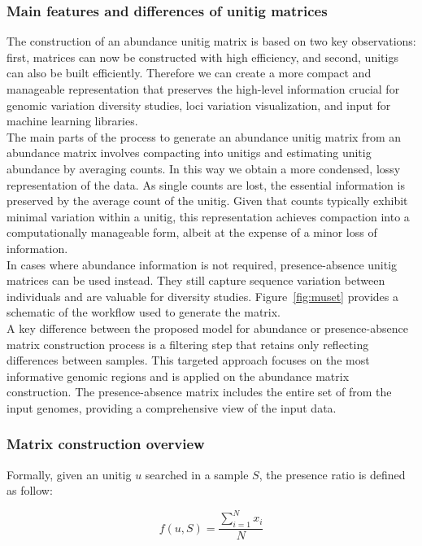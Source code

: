 \subsubsection{Main features and differences of unitig matrices}
The construction of an abundance unitig matrix is based on two key observations: first, \kmer matrices can now be constructed with high efficiency, and second, unitigs can also be built efficiently. Therefore we can create a more compact and manageable representation that preserves the high-level information crucial for genomic variation diversity studies, loci variation visualization, and input for machine learning libraries.\\
The main parts of the process to generate an abundance unitig matrix from an abundance \kmer matrix involves compacting \kmers into unitigs and estimating unitig abundance by averaging \kmer counts. In this way we obtain a more condensed, lossy representation of the data. As single \kmer counts are lost, the essential information is preserved by the average count of the unitig. Given that \kmer counts typically exhibit minimal variation within a unitig, this representation achieves compaction into a computationally manageable form, albeit at the expense of a minor loss of information.\\
In cases where abundance information is not required, presence-absence unitig matrices can be used instead. They still capture sequence variation between individuals and are valuable for diversity studies. Figure~\ref{fig:muset} provides a schematic of the workflow used to generate the matrix.\\
A key difference between the proposed model for abundance or presence-absence matrix construction process is a filtering step that retains only \kmers reflecting differences between samples. This targeted approach focuses on the most informative genomic regions and is applied on the abundance matrix construction. The presence-absence matrix includes the entire set of \kmers from the input genomes, providing a comprehensive view of the input data.\\

\subsubsection{Matrix construction overview}
Formally, given an unitig $u$ searched in a sample $S$, the \kmer presence ratio is defined as follow:

\begin{equation}
	f(u, S) = \frac{\sum_{i=1}^{N}{x_i}}{N}
\end{equation}

